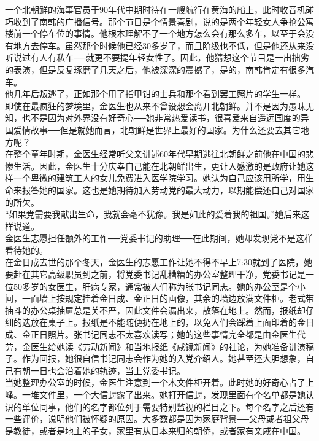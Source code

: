 一个北朝鲜的海事官员于90年代中期时待在一艘航行在黄海的船上，此时收音机碰巧收到了南韩的广播信号。那个节目是个情景喜剧，说的是两个年轻女人争抢公寓楼前一个停车位的事情。他根本理解不了一个地方怎么会有那么多车，以至于会没有地方去停车。虽然那个时候他已经30多岁了，而且阶级也不低，但是他还从来没听说过有人有私车──就更不要提年轻女性了。因此，他猜想这个节目是一出拙劣的表演，但是反复琢磨了几天之后，他被深深的震撼了，是的，南韩肯定有很多汽车。\\

他几年后叛逃了，正如那个用了指甲钳的士兵和那个看到罢工照片的学生一样。\\

即使在最疯狂的梦境里，金医生也从来不曾设想会离开北朝鲜。并不是因为愚昧无知，也不是因为对外界没有好奇心──她非常热爱读书，很喜爱来自遥远国度的异国爱情故事──但是就她而言，北朝鲜是世界上最好的国家。为什么还要去其它地方呢？\\

在整个童年时期，金医生经常听父亲讲述60年代早期逃往北朝鲜之前他在中国的悲惨生活。因此，金医生十分庆幸自己能在北朝鲜出生，更让人感激的是政府让她这样一个卑微的建筑工人的女儿免费进入医学院学习。她认为自己应该用所学，用生命来报答她的国家。这也是她期待加入劳动党的最大动力，以期能偿还自己对国家的所欠。\\

“如果党需要我献出生命，我就会毫不犹豫。我是如此的爱着我的祖国。”她后来这样说道。\\

金医生志愿担任额外的工作──党委书记的助理──在此期间，她却发现党不是这样看待她的。\\

在金日成去世的那个冬天，金医生的志愿工作让她不得不早上7:30就到了医院，她要赶在其它高级职员到之前，将党委书记乱糟糟的办公室整理干净，党委书记是一位50多岁的女医生，肝病专家，通常被人们称为张书记同志。她的办公室是个小间，一面墙上按规定挂着金日成、金正日的画像，其余的墙边放满文件柜。老式带抽斗的办公桌抽屉总是关不严，因此文件会漏出来，散落在地上。然而，报纸却仔细的迭放在桌子上。报纸是不能随便扔在地上的，以免人们会踩着上面印着的金日成、金正日照片。张书记同志不太喜欢读写；她的这些事情完全都是由金医生代劳，金医生给她读《劳动新闻》和当地报纸《咸镜新闻》的社论，为她准备讲演稿子。作为回报，她很自信书记同志会作为她的入党介绍人。她甚至还大胆想象，自己有朝一日也会沿着她的轨迹，当上党委书记。\\

当她整理办公室的时候，金医生注意到一个木文件柜开着。此时她的好奇心占了上峰。一堆文件里，一个大信封露了出来。她打开信封，发现里面有个名单都是她认识的单位同事，他们的名字都位列于需要特别监视的栏目之下。每个名字之后还有一些评价，说明他们被怀疑的原因。大多数都是因为家庭背景──父母或者祖父母是教徒，或者是地主的子女，家里有从日本来归的朝侨，或者家有亲戚在中国。\\

